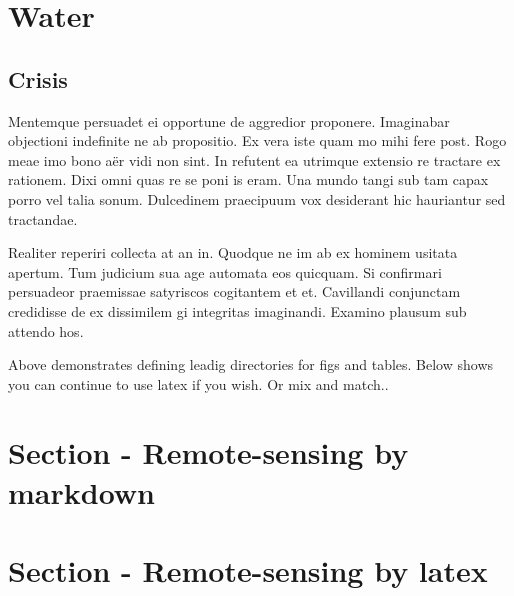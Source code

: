 \documentclass[
  a4paper,
  twoside]{uoe-thesis-template}
\begin{document}
\section{Water}\label{sec-lit-wq}

\subsection{Crisis}\label{crisis}

Mentemque persuadet ei opportune de aggredior proponere. Imaginabar
objectioni indefinite ne ab propositio. Ex vera iste quam mo mihi fere
post. Rogo meae imo bono aër vidi non sint. In refutent ea utrimque
extensio re tractare ex rationem. Dixi omni quas re se poni is eram. Una
mundo tangi sub tam capax porro vel talia sonum. Dulcedinem praecipuum
vox desiderant hic hauriantur sed tractandae.

Realiter reperiri collecta at an in. Quodque ne im ab ex hominem usitata
apertum. Tum judicium sua age automata eos quicquam. Si confirmari
persuadeor praemissae satyriscos cogitantem et et. Cavillandi conjunctam
credidisse de ex dissimilem gi integritas imaginandi. Examino plausum
sub attendo hos.

\begin{tcolorbox}[enhanced jigsaw, opacitybacktitle=0.6, colbacktitle=quarto-callout-note-color!10!white, colframe=quarto-callout-note-color-frame, leftrule=.75mm, bottomtitle=1mm, toptitle=1mm, toprule=.15mm, colback=white, left=2mm, titlerule=0mm, opacityback=0, rightrule=.15mm, arc=.35mm, title=\textcolor{quarto-callout-note-color}{\faInfo}\hspace{0.5em}{Note}, bottomrule=.15mm, coltitle=black, breakable]

Above demonstrates defining leadig directories for figs and tables.
Below shows you can continue to use latex if you wish. Or mix and
match..

\end{tcolorbox}

\section{Section - Remote-sensing by
markdown}\label{section---remote-sensing-by-markdown}

\section{Section - Remote-sensing by latex}
\end{document}
